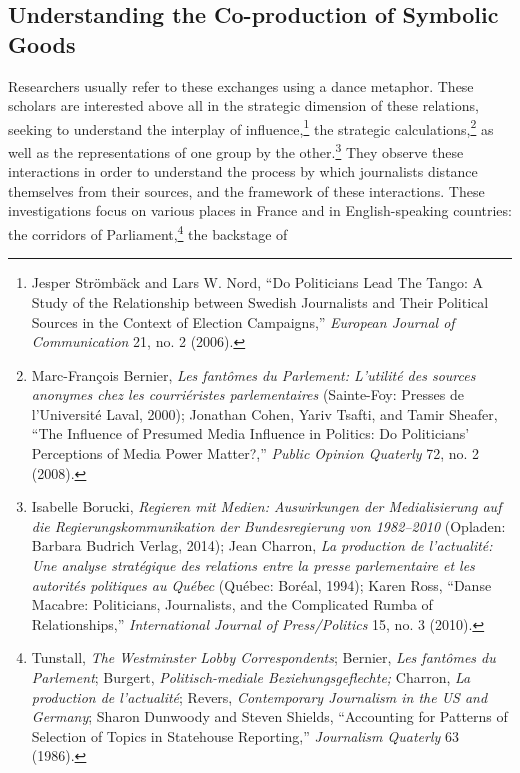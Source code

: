 \documentclass{tufte-handout}
\begin{document}
\hypertarget{understanding-the-co-production-of-symbolic-goods}{%
\subsection{Understanding the Co-production of
Symbolic
Goods}\label{understanding-the-co-production-of-symbolic-goods}}

Researchers usually refer to these exchanges using a dance metaphor.
These scholars are interested above all in the strategic dimension of
these relations, seeking to understand the interplay of
influence,\footnote{Jesper Strömbäck and Lars W. Nord, ``Do Politicians
  Lead The Tango: A Study of the Relationship between Swedish
  Journalists and Their Political Sources in the Context of Election
  Campaigns,'' \emph{European Journal of Communication} 21, no. 2
  (2006).} the strategic calculations,\footnote{Marc-François Bernier,
  \emph{Les fantômes du Parlement: L'utilité des sources anonymes chez
  les courriéristes parlementaires} (Sainte-Foy: Presses de l'Université
  Laval, 2000); Jonathan Cohen, Yariv Tsafti, and Tamir Sheafer, ``The
  Influence of Presumed Media Influence in Politics: Do Politicians'
  Perceptions of Media Power Matter?,'' \emph{Public Opinion Quaterly}
  72, no. 2 (2008).} as well as the representations of one group by the
other.\footnote{Isabelle Borucki, \emph{Regieren mit Medien:
  Auswirkungen der Medialisierung auf die Regierungskommunikation der
  Bundesregierung von 1982--2010} (Opladen: Barbara Budrich Verlag,
  2014); Jean Charron, \emph{La production de l'actualité: Une analyse
  stratégique des relations entre la presse parlementaire et les
  autorités politiques au Québec} (Québec: Boréal, 1994); Karen Ross,
  ``Danse Macabre: Politicians, Journalists, and the Complicated Rumba
  of Relationships,'' \emph{International Journal of Press/Politics} 15,
  no. 3 (2010).} They observe these interactions in order to understand
the process by which journalists distance themselves from their sources,
and the framework of these interactions. These investigations focus on
various places in France and in English-speaking countries: the
corridors of Parliament,\footnote{Tunstall, \emph{The Westminster Lobby
  Correspondents}; Bernier, \emph{Les fantômes du Parlement}; Burgert,
  \emph{Politisch-mediale Beziehungsgeflechte;} Charron, \emph{La
  production de l'actualité}; Revers, \emph{Contemporary Journalism in
  the US and Germany}; Sharon Dunwoody and Steven Shields, ``Accounting
  for Patterns of Selection of Topics in Statehouse Reporting,''
  \emph{Journalism Quaterly} 63 (1986).} the backstage of
\end{document}
